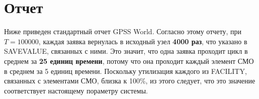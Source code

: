 \documentclass{article}
\begin{document}
\section{Отчет}

Ниже приведен стандартный отчет GPSS World.
Согласно этому отчету, при $T=100000$, 
каждая заявка вернулась в исходный узел \textbf{4000 раз},
что указано в SAVEVALUE, связанных с ними.
Это значит, что одна заявка проходит цикл в среднем за \textbf{25 единиц времени},
потому что она проходит каждый элемент СМО в среднем за 5 единиц времени.
Поскольку утилизация каждого из FACILITY, связанных с элементами СМО, близка к 100\%,
из этого следует, что это значение соответствует настоящему пораметру системы.


\end{document}
